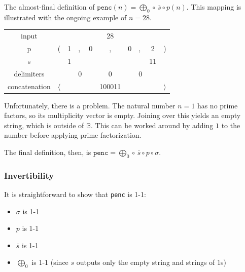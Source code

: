 \documentclass[12pt,reqno]{article}
\begin{document}
The almost-final definition of $\texttt{penc}(n) = \bigoplus_0 \circ \, \overline{s} \circ p(n)$. This mapping is illustrated with the ongoing example of $n = 28$.
\begin{center} \begin{tabular}{ |c| l cl cc cl c r| } 
  \hline
    input                &                &    &    &     &   28     &     &    &      &  \\
    p                      &       (        & 1 & ,  & 0 & ,           & 0  & ,  &  2  & ) \\
  \hline
    s                      &                 & 1 &    &    &             &     &    & 11  & \\ 
    delimiters        &                 &    & 0 &    &    0       &     & 0 &      & \\
  \hline
    concatenation & $\langle$ &    &     &   & 100011 &    &     &      & $\rangle$ \\
  \hline
\end{tabular} \end{center}
Unfortunately, there is a problem. The natural number $n=1$ has no prime factors, so its multiplicity vector is empty. Joining over this yields an empty string, which is outside of $\mathbb{B}$. This can be worked around by adding $1$ to the number before applying prime factorization.

The final definition, then, is $\texttt{penc} = \bigoplus_0 \circ \, \overline{s} \circ p \circ \sigma$.

\subsubsection{Invertibility}

It is straightforward to show that \texttt{penc} is 1-1: \begin{itemize}
  \item $\sigma$ is 1-1
  \item $p$ is 1-1
  \item $\overline{s}$ is 1-1
  \item $\bigoplus_0$ is 1-1 (since $s$ outputs only the empty string and strings of $1$s)
\end{itemize}
\end{document}
